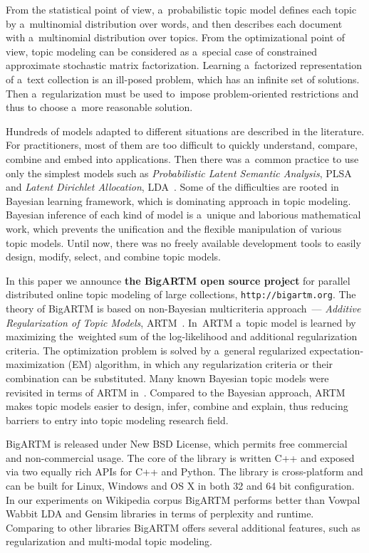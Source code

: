 \documentclass{llncs}
\begin{document}
From the statistical point of view, a~probabilistic topic model
defines each topic by a~multinomial distribution over words,
and then describes each document with a~multinomial distribution over topics.
From the optimizational point of view,
topic modeling can be considered as a~special case
of constrained approximate stochastic matrix factorization.
Learning a~factorized representation of a~text collection
is an ill-posed problem, which has an infinite set of solutions.
Then a~regularization must be used
to~impose problem-oriented restrictions
and thus to choose a~more reasonable solution.

Hundreds of models adapted to different situations are described in the literature.
For practitioners, most of them are too difficult to quickly
understand, compare, combine and embed into applications.
Then there was a~common practice to use only the simplest models such as
\emph{Probabilistic Latent Semantic Analysis}, PLSA~\cite{hofmann99plsi} and
\emph{Latent Dirichlet Allocation}, LDA~\cite{blei03latent}.
Some of the difficulties are rooted in Bayesian learning framework,
which is dominating approach in topic modeling.
Bayesian inference of each kind of model is a~unique and laborious mathematical work,
which prevents the unification and the flexible manipulation of various topic models.
Until now, there was no freely available development tools
to easily design, modify, select, and combine topic models.

In this paper we announce \textbf{the BigARTM open source project} for
parallel distributed online topic modeling of large collections,
\texttt{http://bigartm.org}.
The theory of BigARTM is based on non-Bayesian multicriteria approach~---
\emph{Additive Regularization of Topic Models}, ARTM~\cite{voron14dan-eng}.
In~ARTM a~topic model is learned by maximizing the~weighted sum
of the log-likelihood and additional regularization criteria.
The optimization problem is solved by a~general regularized expectation-maximization (EM) algorithm,
in which any regularization criteria or their combination can be substituted.
Many known Bayesian topic models were revisited in terms of ARTM in~\cite{voron14aist,voron14mlj}.
Compared to the Bayesian approach,
ARTM makes topic models easier to design, infer, combine and explain,
thus reducing barriers to entry into topic modeling research field.

BigARTM is released under New BSD License, which permits free commercial and non-commercial usage.
The core of the library is written C++ and exposed via two equally rich APIs for C++ and Python.
The library is cross-platform and can be built for Linux, Windows and OS X in both 32 and 64 bit configuration.
In our experiments on Wikipedia corpus BigARTM performs better than Vowpal Wabbit LDA and Gensim libraries
in terms of perplexity and runtime.
Comparing to other libraries BigARTM offers several additional features,
such as regularization and multi-modal topic modeling.
\end{document}
